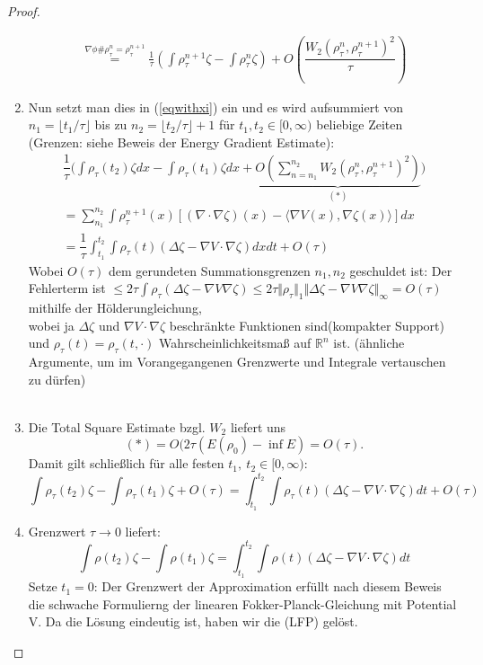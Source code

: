 \documentclass[11pt,a4paper,notitlepage]{scrreprt}
\newcommand{\RR}{\mathbb{R}}
\begin{document}
\begin{proof}
\begin{enumerate}
\begin{align*}
\overset{\nabla\phi\#\rho_\tau^n=\rho_\tau^{n+1}}=\frac{1}{\tau}\left(\int\rho_\tau^{n+1}\zeta-\int\rho_\tau^n\zeta\right)+O\left(\dfrac{W_2(\rho_\tau^n,\rho_\tau^{n+1})^2}{\tau}\right)
\end{align*}
\item Nun setzt man dies in (\ref{eqwithxi}) ein und es wird aufsummiert von $n_1=\lfloor t_1/\tau\rfloor$ bis zu $n_2=\lfloor t_2/\tau\rfloor+1$ für $t_1,t_2\in[0,\infty)$ beliebige Zeiten (Grenzen: siehe Beweis der Energy Gradient Estimate):
\begin{eqnarray}
\dfrac{1}{\tau}\Bigg(\int\rho_\tau(t_2)\zeta dx-\int\rho_\tau(t_1)\zeta dx+\underset{(*)}{\underbrace{O\left(\sum_{n=n_1}^{n_2}W_2(\rho_\tau^n,\rho_\tau^{n+1})^2\right)}}\Bigg)\\
=\sum_{n_1}^{n_2}\int\rho_\tau^{n+1}(x)\left[(\nabla\cdot \nabla\zeta)(x)-\langle\nabla V(x),\nabla\zeta(x)\rangle \right]dx \\=\dfrac{1}{\tau}\int_{t_1}^{t_2}\int\rho_\tau(t)(\Delta\zeta-\nabla V\cdot\nabla\zeta)dx dt+O(\tau)
\end{eqnarray}
Wobei $O(\tau)$ dem gerundeten Summationsgrenzen $n_1,n_2$ geschuldet ist: Der Fehlerterm ist 
$\leq 2\tau \int\rho_\tau(\Delta\zeta-\nabla V\nabla\zeta)\leq 2\tau\Vert\rho_\tau\Vert_1\Vert\Delta\zeta-\nabla V\nabla\zeta\Vert_\infty=O(\tau)$ mithilfe der Hölderungleichung,\\
wobei ja $\Delta\zeta$ und $\nabla V\cdot\nabla\zeta$  beschränkte Funktionen sind(kompakter Support) und $\rho_\tau(t)=\rho_\tau(t,\cdot)$ Wahrscheinlichkeitsmaß auf $\RR^n$ ist. (ähnliche Argumente, um im Vorangegangenen Grenzwerte und Integrale vertauschen zu dürfen)\\\\
\item Die Total Square Estimate bzgl. $W_2$ liefert uns 
\[(*)=O(2\tau(E(\rho_0)-\inf E)=O(\tau).\]
Damit gilt schließlich für alle festen $t_1,~t_2\in [0,\infty)$:
\begin{equation}
\int\rho_\tau(t_2)\zeta-\int\rho_\tau(t_1)\zeta+O(\tau)=\int_{t_1}^{t_2}\int\rho_\tau(t)(\Delta\zeta-\nabla V\cdot\nabla\zeta)dt+O(\tau)
\end{equation}
\item Grenzwert $\tau\to 0$ liefert:
\begin{equation}
\int\rho(t_2)\zeta-\int\rho(t_1)\zeta=\int_{t_1}^{t_2}\int\rho(t)(\Delta\zeta-\nabla V\cdot\nabla\zeta)dt
\end{equation}
Setze $t_1=0$: Der Grenzwert der Approximation erfüllt nach diesem Beweis die schwache Formulierng der linearen Fokker-Planck-Gleichung mit Potential V. Da die Lösung eindeutig ist, haben wir die (LFP) gelöst. 


\end{enumerate}
\end{proof}
\end{document}
